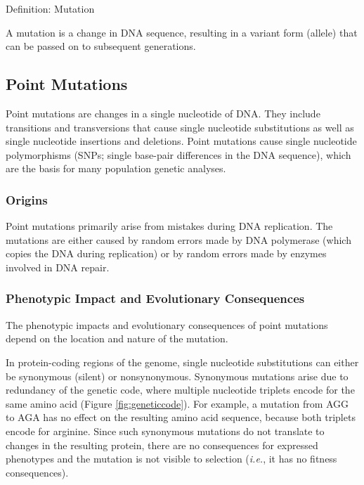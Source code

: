 \documentclass[
]{book}
\begin{document}
Definition: Mutation

A mutation is a change in DNA sequence, resulting in a variant form (allele) that can be passed on to subsequent generations.

\hypertarget{point-mutations}{%
\subsection{Point Mutations}\label{point-mutations}}

Point mutations are changes in a single nucleotide of DNA. They include transitions and transversions that cause single nucleotide substitutions as well as single nucleotide insertions and deletions. Point mutations cause single nucleotide polymorphisms (SNPs; single base-pair differences in the DNA sequence), which are the basis for many population genetic analyses.

\hypertarget{origins}{%
\subsubsection*{Origins}\label{origins}}

Point mutations primarily arise from mistakes during DNA replication. The mutations are either caused by random errors made by DNA polymerase (which copies the DNA during replication) or by random errors made by enzymes involved in DNA repair.

\hypertarget{phenotypic-impact-and-evolutionary-consequences}{%
\subsubsection*{Phenotypic Impact and Evolutionary Consequences}\label{phenotypic-impact-and-evolutionary-consequences}}

The phenotypic impacts and evolutionary consequences of point mutations depend on the location and nature of the mutation.

In protein-coding regions of the genome, single nucleotide substitutions can either be synonymous (silent) or nonsynonymous. Synonymous mutations arise due to redundancy of the genetic code, where multiple nucleotide triplets encode for the same amino acid (Figure \ref{fig:geneticcode}). For example, a mutation from AGG to AGA has no effect on the resulting amino acid sequence, because both triplets encode for arginine. Since such synonymous mutations do not translate to changes in the resulting protein, there are no consequences for expressed phenotypes and the mutation is not visible to selection (\emph{i.e.}, it has no fitness consequences).
\end{document}
